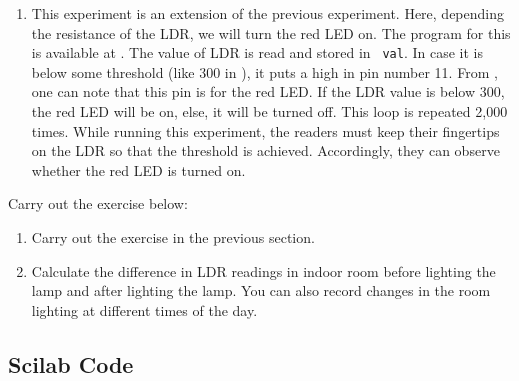 \begin{enumerate}
\item This experiment is an extension of the previous
experiment. Here, depending the resistance of the LDR, we will
  turn the red LED on.  The program for this is available at
  .  The value of LDR is read and stored in {\tt
    val}.  In case it is below some threshold (like 300 in ), 
    it puts a high in pin number 11.  From , 
    one can note that this pin is for the red LED.  If the LDR value is below 300, 
    the red LED will be on, else, it will be turned off.  
    This loop is repeated 2,000 times. While running this experiment, the readers 
    must keep their fingertips on the LDR so that the threshold is achieved. Accordingly, 
    they can observe whether the red LED is turned on. 
\end{enumerate}

\begin{exercise}
Carry out the exercise below:
\begin{enumerate}
\item Carry out the exercise in the previous section. 
\item Calculate the difference in LDR readings in indoor room
  before lighting the lamp and after lighting the lamp. You can also
  record changes in the room lighting at different times of the day.
\end{enumerate}
\end{exercise}

\subsection{Scilab Code}
\label{sec:ldr-scilab-code}

